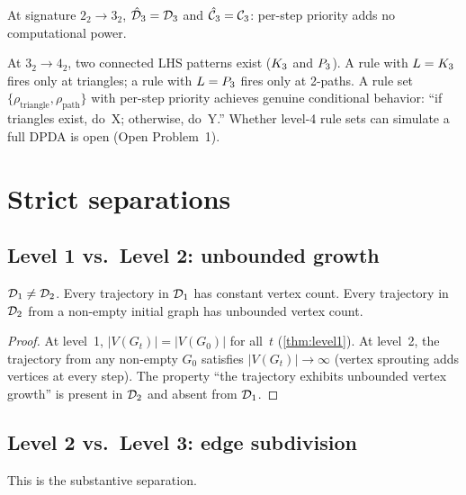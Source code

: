 \documentclass{../shared/primo}
\begin{document}
\begin{corollary}
At signature $2_2 \to 3_2$, $\hat{\mathcal{D}}_{3} = \mathcal{D}_{3}$ and $\hat{\mathcal{C}}_{3} = \mathcal{C}_{3}$: per-step priority adds no computational power.
\end{corollary}

\begin{remark}
At $3_2 \to 4_2$, two connected LHS patterns exist ($K_{3}$ and $P_{3}$). A rule with $L = K_{3}$ fires only at triangles; a rule with $L = P_{3}$ fires only at 2-paths. A rule set $\{\rho_{\text{triangle}}, \rho_{\text{path}}\}$ with per-step priority achieves genuine conditional behavior: ``if triangles exist, do~X; otherwise, do~Y.'' Whether level-4 rule sets can simulate a full DPDA is open (Open Problem~1).
\end{remark}


\section{Strict separations}
\label{sec:separations}

\subsection{Level 1 vs.\ Level 2: unbounded growth}

\begin{theorem}\label{thm:sep12}
$\mathcal{D}_{1} \neq \mathcal{D}_{2}$. Every trajectory in $\mathcal{D}_{1}$ has constant vertex count. Every trajectory in $\mathcal{D}_{2}$ from a non-empty initial graph has unbounded vertex count.
\end{theorem}

\begin{proof}
At level~1, $|V(G_t)| = |V(G_0)|$ for all~$t$ (\cref{thm:level1}). At level~2, the trajectory from any non-empty $G_0$ satisfies $|V(G_t)| \to \infty$ (vertex sprouting adds vertices at every step). The property ``the trajectory exhibits unbounded vertex growth'' is present in $\mathcal{D}_{2}$ and absent from $\mathcal{D}_{1}$.
\end{proof}

\subsection{Level 2 vs.\ Level 3: edge subdivision}

This is the substantive separation.
\end{document}
